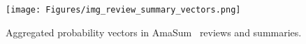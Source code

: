 \begin{figure}
  \centering
  \texttt{[image: Figures/img\_review\_summary\_vectors.png]}
  \caption{Aggregated \taxtype{} probability vectors in AmaSum~\citep{brazinskas2021amasum} reviews and summaries.}
  \label{fig_review_vs_summaries_vectors}
\end{figure}